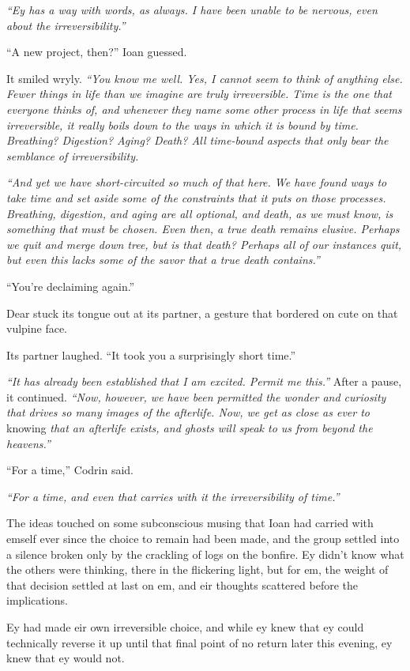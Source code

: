 \emph{``Ey has a way with words, as always. I have been unable to be nervous, even about the irreversibility.''}

``A new project, then?'' Ioan guessed.

It smiled wryly. \emph{``You know me well. Yes, I cannot seem to think of anything else. Fewer things in life than we imagine are truly irreversible. Time is the one that everyone thinks of, and whenever they name some other process in life that seems irreversible, it really boils down to the ways in which it is bound by time. Breathing? Digestion? Aging? Death? All time-bound aspects that only bear the semblance of irreversibility.}

\emph{``And yet we have short-circuited so much of that here. We have found ways to take time and set aside some of the constraints that it puts on those processes. Breathing, digestion, and aging are all optional, and death, as we must know, is something that must be chosen. Even then, a true death remains elusive. Perhaps we quit and merge down tree, but is that death? Perhaps all of our instances quit, but even this lacks some of the savor that a true death contains.''}

``You're declaiming again.''

Dear stuck its tongue out at its partner, a gesture that bordered on cute on that vulpine face.

Its partner laughed. ``It took you a surprisingly short time.''

\emph{``It has already been established that I am excited. Permit me this.''} After a pause, it continued. \emph{``Now, however, we have been permitted the wonder and curiosity that drives so many images of the afterlife. Now, we get as close as ever to} knowing \emph{that an afterlife exists, and ghosts will speak to us from beyond the heavens.''}

``For a time,'' Codrin said.

\emph{``For a time, and even that carries with it the irreversibility of time.''}

The ideas touched on some subconscious musing that Ioan had carried with emself ever since the choice to remain had been made, and the group settled into a silence broken only by the crackling of logs on the bonfire. Ey didn't know what the others were thinking, there in the flickering light, but for em, the weight of that decision settled at last on em, and eir thoughts scattered before the implications.

Ey had made eir own irreversible choice, and while ey knew that ey could technically reverse it up until that final point of no return later this evening, ey knew that ey would not.

